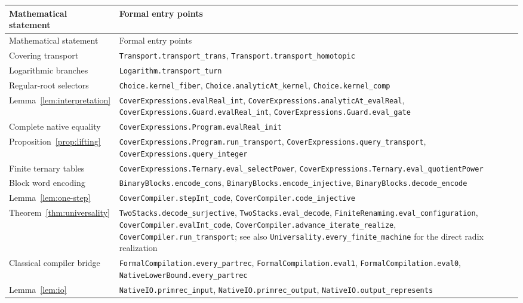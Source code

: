 \documentclass[11pt]{article}
\numberwithin{equation}{section}
\theoremstyle{definition}
\theoremstyle{remark}
\newcommand{\code}[1]{\nolinkurl{#1}}
\begin{document}
\begingroup\small
\setlength{\tabcolsep}{4pt}
\renewcommand{\arraystretch}{1.05}
\begin{longtable}{@{}>{\raggedright\arraybackslash}p{}
  >{\raggedright\arraybackslash}p{}@{}}
\toprule
Mathematical statement & Formal entry points\\
\midrule
\endfirsthead
\toprule
Mathematical statement & Formal entry points\\
\midrule
\endhead
\bottomrule
\endfoot
Covering transport & \code{Transport.transport_trans},
 \code{Transport.transport_homotopic}\\
Logarithmic branches & \code{Logarithm.transport_turn}\\
Regular-root selectors & \code{Choice.kernel_fiber},
 \code{Choice.analyticAt_kernel}, \code{Choice.kernel_comp}\\
Lemma~\ref{lem:interpretation} &
 \code{CoverExpressions.evalReal_int},
 \code{CoverExpressions.analyticAt_evalReal},
 \code{CoverExpressions.Guard.evalReal_int},
 \code{CoverExpressions.Guard.eval_gate}\\
Complete native equality &
 \code{CoverExpressions.Program.evalReal_init}\\
Proposition~\ref{prop:lifting} &
 \code{CoverExpressions.Program.run_transport},
 \code{CoverExpressions.query_transport},
 \code{CoverExpressions.query_integer}\\
Finite ternary tables &
 \code{CoverExpressions.Ternary.eval_selectPower},
 \code{CoverExpressions.Ternary.eval_quotientPower}\\
Block word encoding & \code{BinaryBlocks.encode_cons},
 \code{BinaryBlocks.encode_injective},
 \code{BinaryBlocks.decode_encode}\\
Lemma~\ref{lem:one-step} & \code{CoverCompiler.stepInt_code},
 \code{CoverCompiler.code_injective}\\
Theorem~\ref{thm:universality} &
 \code{TwoStacks.decode_surjective}, \code{TwoStacks.eval_decode},
 \code{FiniteRenaming.eval_configuration},
 \code{CoverCompiler.evalInt_code},
 \code{CoverCompiler.advance_iterate_realize},
 \code{CoverCompiler.run_transport}; see also
 \code{Universality.every_finite_machine} for the direct radix realization\\
Classical compiler bridge & \code{FormalCompilation.every_partrec},
 \code{FormalCompilation.eval1}, \code{FormalCompilation.eval0},
 \code{NativeLowerBound.every_partrec}\\
Lemma~\ref{lem:io} & \code{NativeIO.primrec_input},
 \code{NativeIO.primrec_output}, \code{NativeIO.output_represents}\\

\end{longtable}
\end{document}
